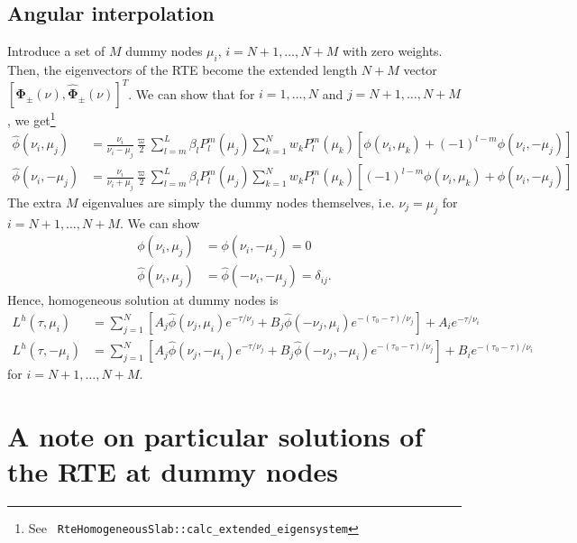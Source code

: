 \documentclass[11pt]{article}
\newcommand{\gvec}[1]{\boldsymbol{#1}}
\begin{document}
\subsection{Angular interpolation}
Introduce a set of $M$ dummy nodes $\mu_i$, $i=N+1,\ldots,N+M$ with
zero weights. Then, the eigenvectors of the RTE become the extended
length $N+M$ vector $[\gvec{\Phi}_\pm(\nu),
\hat{\gvec{\Phi}}_\pm(\nu)]^T$. We can show that for $i=1,\ldots,N$
and $j=N+1,\ldots,N+M$, we get\footnote{See {\tt
    RteHomogeneousSlab::calc\_extended\_eigensystem}}
\begin{align}
  \hat{\phi}(\nu_i,\mu_j) &= \frac{\nu_i}{\nu_i-\mu_j} \frac{\varpi}{2}
  \sum_{l=m}^L \beta_l P_l^m(\mu_j) \sum_{k=1}^N
  w_k P_l^m(\mu_k)
  \left[
    \phi(\nu_i,\mu_k) + (-1)^{l-m}\phi(\nu_i,-\mu_j)
  \right] \\
  \hat{\phi}(\nu_i,-\mu_j) &= \frac{\nu_i}{\nu_i+\mu_j} \frac{\varpi}{2}
  \sum_{l=m}^L \beta_l P_l^m(\mu_j) \sum_{k=1}^N
  w_k P_l^m(\mu_k)
  \left[
    (-1)^{l-m} \phi(\nu_i,\mu_k) + \phi(\nu_i,-\mu_j)
  \right]
\end{align}
The extra $M$ eigenvalues are simply the dummy nodes themselves,
i.e. $\nu_j = \mu_j$ for $i=N+1,\ldots,N+M$. We can show
\begin{align}
  \phi(\nu_i,\mu_j) &= \phi(\nu_i,-\mu_j) = 0 \\
  \hat{\phi}(\nu_i,\mu_j) &= \hat{\phi}(-\nu_i,-\mu_j) = \delta_{ij}.
\end{align}
Hence, homogeneous solution at dummy nodes is
\begin{align}
  L^h(\tau,\mu_i) &= \sum_{j=1}^N
  \left[
    A_j \hat{\phi}(\nu_j, \mu_i) e^{-\tau/\nu_j} +
    B_j \hat{\phi}(-\nu_j, \mu_i) e^{-(\tau_0-\tau)/\nu_j}
  \right]
  + A_i e^{-\tau/\nu_i} \\
  L^h(\tau,-\mu_i) &= \sum_{j=1}^N
  \left[
    A_j \hat{\phi}(\nu_j, -\mu_i) e^{-\tau/\nu_j} +
    B_j \hat{\phi}(-\nu_j, -\mu_i) e^{-(\tau_0-\tau)/\nu_j}
  \right]
  + B_i e^{-(\tau_0-\tau)/\nu_i}
\end{align}
for $i=N+1,\ldots,N+M$.

\appendix

\section{A note on particular solutions of the RTE at dummy nodes}
\end{document}
